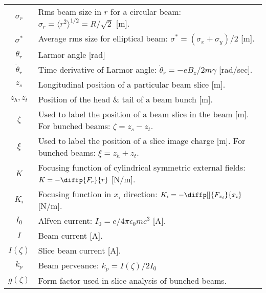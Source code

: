 \begin{table}[h]
\begin{tabularx}{\textwidth-1cm}{|c@{\hspace{1.5cm}}|X|}
    $\sigma_r$     & Rms beam size in $r$ for a circular beam: $\sigma_r =\langle r^2\rangle^{1/2} = R/\sqrt{2}$ [m].  \\
    $\sigma^*$     & Average rms size for elliptical beam: $\sigma^* = (\sigma_x+\sigma_y)/2$ [m].                     \\
    $\theta_r$     & Larmor angle [rad]                                                                                \\
    $\dot\theta_r$ & Time derivative of Larmor angle: $\dot\theta_r = -eB_z/2m\gamma$ [rad/sec].                       \\
    $z_s$          & Longitudinal position of a particular beam slice [m].                                             \\
    $z_h,z_t$      & Position of the head \& tail of a beam bunch [m].                                                 \\
    $\zeta$        & Used to label the position of a beam slice in the beam [m]. For bunched beams: $\zeta = z_s-z_t$. \\
    $\xi$          & Used to label the position of a slice image charge [m]. For bunched beams: $\xi = z_h + z_t$.     \\
    $K$            & Focusing function of cylindrical symmetric external fields: $K = -\diffp{F_r}{r}$ [N/m].          \\
    $K_i$          & Focusing function in $x_i$ direction: $K_i = -\diffp[]{F_{x_i}}{x_i}$ [N/m].                      \\
    $I_0$          & Alfven current: $I_0= e/4\pi\epsilon_0mc^3$ [A].                                                  \\
    $I$            & Beam current [A].                                                                                 \\
    $I(\zeta)$     & Slice beam current [A].                                                                           \\
    $k_p$          & Beam perveance: $k_p = I(\zeta)/2I_0$                                                             \\
    $g(\zeta)$     & Form factor used in slice analysis of bunched beams.                                              \\
\hline
\end{tabularx}
\end{table}

